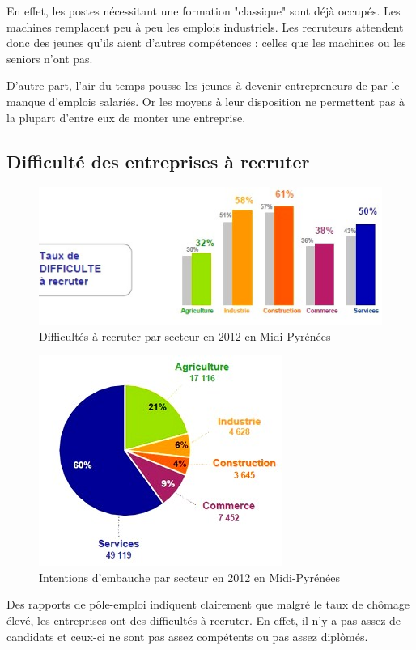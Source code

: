 En effet, les postes nécessitant une formation "classique" sont déjà occupés. Les machines remplacent peu à peu les emplois industriels. Les recruteurs attendent donc des jeunes qu'ils aient d'autres compétences : celles que les machines ou les seniors n'ont pas.

D'autre part, l'air du temps pousse les jeunes à devenir entrepreneurs de par le manque d'emplois salariés. Or les moyens à leur disposition ne permettent pas à la plupart d'entre eux de monter une entreprise.


\subsection{Difficulté des entreprises à recruter}
\begin{figure}[p]
\centering
\includegraphics[trim=7cm 0cm 0cm 0cm, clip=true, scale=1]{../resources/illustrations/diff_recrut}
\caption{Difficultés à recruter par secteur en 2012 en Midi-Pyrénées \cite{recrutement_midi_pyr}}
\label{diff_recrut}
\end{figure}
\begin{figure}[p]
\centering
\includegraphics[scale=0.8]{../resources/illustrations/embauches}
\caption{Intentions d'embauche par secteur en 2012 en Midi-Pyrénées \cite{recrutement_midi_pyr}}
\label{embauche}
\end{figure}
Des rapports de pôle-emploi indiquent clairement que malgré le taux de chômage élevé, les entreprises ont des difficultés à recruter. En effet, il n'y a pas assez de candidats et ceux-ci ne sont pas assez compétents ou pas assez diplômés. 

